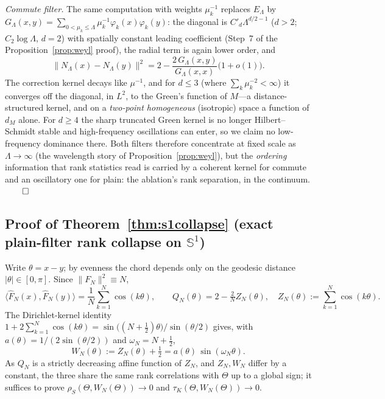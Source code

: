 \documentclass[review,supplement]{siamart220329}
\begin{document}
\emph{Commute filter.} The same computation with weights $\mu_k^{-1}$ replaces
$E_\Lambda$ by $G_\Lambda(x,y)=\sum_{0<\mu_k\le\Lambda}\mu_k^{-1}
\varphi_k(x)\varphi_k(y)$: the diagonal is $C'_d\Lambda^{d/2-1}$ ($d>2$;
$C_2\log\Lambda$, $d=2$) with spatially constant leading coefficient
(Step~7 of the Proposition~\ref{prop:weyl} proof), the radial term is again
lower order, and
\[
\big\lVert N_\Lambda(x)-N_\Lambda(y)\big\rVert^2
=2-\frac{2\,G_\Lambda(x,y)}{G_\Lambda(x,x)}\big(1+o(1)\big).
\]
The correction kernel decays like $\mu^{-1}$, and for $d\le3$ (where
$\sum_k\mu_k^{-2}<\infty$) it converges off the diagonal, in $L^2$, to the Green's
function of $M$---a distance-structured kernel, and on a \emph{two-point
homogeneous} (isotropic) space a function of $d_M$ alone. For $d\ge4$ the sharp
truncated Green kernel is no longer Hilbert--Schmidt stable and high-frequency
oscillations can enter, so we claim no low-frequency dominance there. Both filters
therefore concentrate at fixed scale as $\Lambda\to\infty$ (the wavelength
story of Proposition~\ref{prop:weyl}), but the \emph{ordering} information
that rank statistics read is carried by a coherent kernel for commute and an
oscillatory one for plain: the ablation's rank separation, in the continuum.
\hfill$\qed$

\subsection*{Proof of Theorem~\ref{thm:s1collapse} (exact plain-filter rank collapse on $\mathbb S^1$)}
Write $\theta=x-y$; by evenness the chord depends only on the geodesic distance
$\lvert\theta\rvert\in[0,\pi]$. Since $\lVert F_N\rVert^2\equiv N$,
\[
\big\langle \widehat F_N(x),\widehat F_N(y)\big\rangle
=\frac1N\sum_{k=1}^N\cos(k\theta),
\qquad
Q_N(\theta)=2-\tfrac2N Z_N(\theta),\quad
Z_N(\theta):=\sum_{k=1}^N\cos(k\theta).
\]
The Dirichlet-kernel identity $1+2\sum_{k=1}^N\cos(k\theta)
=\sin\!\big((N+\tfrac12)\theta\big)/\sin(\theta/2)$ gives, with
$a(\theta)=1/(2\sin(\theta/2))$ and $\omega_N=N+\tfrac12$,
\[
W_N(\theta):=Z_N(\theta)+\tfrac12=a(\theta)\,\sin(\omega_N\theta).
\]
As $Q_N$ is a strictly decreasing affine function of $Z_N$, and $Z_N,W_N$ differ
by a constant, the three share the same rank correlations with $\Theta$ up to a
global sign; it suffices to prove $\rho_S(\Theta,W_N(\Theta))\to0$ and
$\tau_K(\Theta,W_N(\Theta))\to0$.
\end{document}
